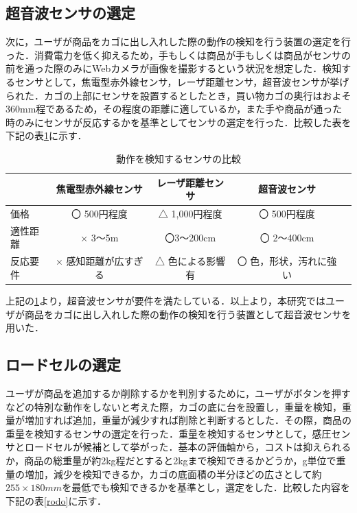 \subsection{超音波センサの選定}


次に，ユーザが商品をカゴに出し入れした際の動作の検知を行う装置の選定を行った．消費電力を低く抑えるため，手もしくは商品が手もしくは商品がセンサの前を通った際のみにWebカメラが画像を撮影するという状況を想定した．検知するセンサとして，焦電型赤外線センサ，レーザ距離センサ，超音波センサが挙げられた．カゴの上部にセンサを設置するとしたとき，買い物カゴの奥行はおよそ360mm程であるため，その程度の距離に適しているか，また手や商品が通った時のみにセンサが反応するかを基準としてセンサの選定を行った．比較した表を下記の表\ref{kyori}に示す．


\begin{table}[htb]
\begin{center}
\caption{動作を検知するセンサの比較}
\begin{tabular}{|l|c|c|c|c|} \hline
 & 焦電型赤外線センサ & レーザ距離センサ & 超音波センサ \\ \hline \hline
価格 & 〇 500円程度 & △ 1,000円程度 & 〇 500円程度 \\
適性距離 & × 3～5m & 〇3～200cm & 〇 2～400cm \\ 
反応要件 & × 感知距離が広すぎる & △ 色による影響有 & 〇 色，形状，汚れに強い \\ \hline
\end{tabular}
\label{kyori}
\end{center}
\end{table}

上記の\ref{kyori}より，超音波センサが要件を満たしている．以上より，本研究ではユーザが商品をカゴに出し入れした際の動作の検知を行う装置として超音波センサを用いた．


\subsection{ロードセルの選定}

ユーザが商品を追加するか削除するかを判別するために，ユーザがボタンを押すなどの特別な動作をしないと考えた際，カゴの底に台を設置し，重量を検知，重量が増加すれば追加，重量が減少すれば削除と判断するとした．その際，商品の重量を検知するセンサの選定を行った．重量を検知するセンサとして，感圧センサとロードセルが候補として挙がった．基本の評価軸から，コストは抑えられるか，商品の総重量が約2kg程だとすると2kgまで検知できるかどうか，g単位で重量の増加，減少を検知できるか，カゴの底面積の半分ほどの広さとして約$255\times180mm$を最低でも検知できるかを基準とし，選定をした．比較した内容を下記の表\ref{rodo}に示す．


